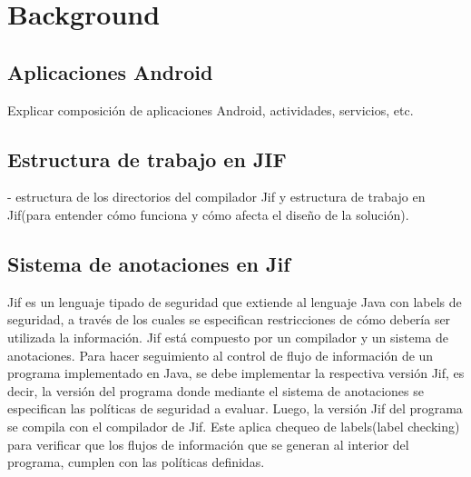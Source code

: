 \section{Background}
\label{sec:back}

\subsection{Aplicaciones Android}
Explicar composición de aplicaciones Android, actividades, servicios, etc.

\subsection{Estructura de trabajo en JIF}
- estructura de los directorios del compilador Jif y estructura de trabajo en
Jif(para entender cómo funciona y cómo afecta el diseño de la
solución).

\subsection{Sistema de anotaciones en Jif}
Jif es un lenguaje tipado de seguridad que extiende al lenguaje Java con labels
de seguridad, a través de los cuales se especifican restricciones de cómo
debería ser utilizada la información.\newline 
Jif está compuesto por un compilador y un sistema de anotaciones.\newline
Para hacer seguimiento al control de flujo de información de un programa
implementado en Java, se debe implementar la respectiva versión Jif, es decir,
la versión del programa donde mediante el sistema de anotaciones se especifican
las políticas de seguridad a evaluar.\newline 
Luego, la versión Jif del programa se compila con el compilador de Jif.
Este aplica chequeo de labels(label checking)\cite{jifRef} para verificar que
los flujos de información que se generan al interior del programa, cumplen con
las políticas definidas.\newline

